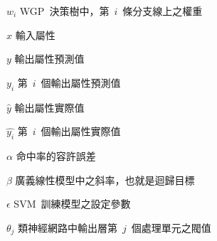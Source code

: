 \begin{SymEntry}
\item[$w_i$]
WGP~決策樹中，第~$i$~條分支線上之權重

\item[$x$]
輸入屬性

\item[$y$]
輸出屬性預測值

\item[$y_i$]
第~$i$~個輸出屬性預測值

\item[$\hat{y}$]
輸出屬性實際值

\item[$\hat{y_i}$]
第~$i$~個輸出屬性實際值


\item[$\alpha$]
命中率的容許誤差

\item[$\beta$]
廣義線性模型中之斜率，也就是迴歸目標

\item[$\epsilon$]
SVM~訓練模型之設定參數

\item[$\theta_j$]
類神經網路中輸出層第~$j$~個處理單元之閥值



\end{SymEntry}